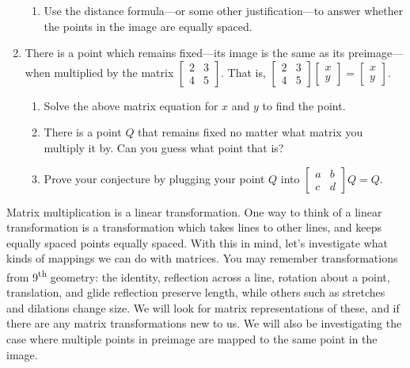 \documentclass[../gatm.tex]{subfiles}
\begin{document}
\begin{enumerate}
\begin{enumerate}
\item Use the distance formula---or some other justification---to answer whether the points in the image are equally spaced.
\end{enumerate}
\item There is a point which remains fixed---its image is the same as its preimage---when multiplied by the matrix $\left[\begin{array}{cc}2 & 3 \\ 4 & 5 \end{array}\right]$. That is, $\left[\begin{array}{cc}2 & 3 \\ 4 & 5 \end{array}\right]\left[\begin{array}{c} x \\ y \end{array}\right]=\left[\begin{array}{c} x \\ y \end{array}\right]$.
\begin{enumerate}
\item Solve the above matrix equation for $x$ and $y$ to find the point.
\item There is a point $Q$ that remains fixed no matter what matrix you multiply it by. Can you guess what point that is?
\item Prove your conjecture by plugging your point $Q$ into $\left[\begin{array}{cc}a & b \\ c & d\end{array}\right]Q=Q$.
\end{enumerate}
\setcounter{mp_problem_i}{\value{enumi}}
\end{enumerate}
Matrix multiplication is a linear transformation. One way to think of a linear transformation is a transformation which takes lines to other lines, and keeps equally spaced points equally spaced. With this in mind, let's investigate what kinds of mappings we can do with matrices. You may remember transformations from 9\textsuperscript{th} geometry: the identity, reflection across a line, rotation about a point, translation, and glide reflection preserve length, while others such as stretches and dilations change size. We will look for matrix representations of these, and if there are any matrix transformations new to us. We will also be investigating the case where multiple points in preimage are mapped to the same point in the image.
\end{document}
